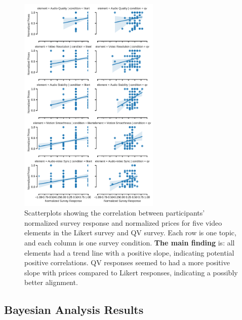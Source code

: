 \begin{figure}[htpb]
    \centering
    \includegraphics[width=0.6\textwidth, keepaspectratio=true]{content/image/correlation_per_element.pdf}
    \caption{
      Scatterplots showing the correlation between participants' normalized survey response and normalized prices for five video elements in the Likert survey and QV survey. Each row is one topic, and each column is one survey condition. \textbf{The main finding} is: all elements had a trend line with a positive slope, indicating potential positive correlations. QV responses seemed to had a more positive slope with prices compared to Likert responses, indicating a possibly better alignment.
    }
    \label{fig:topic_covariate_exp2}
\end{figure}


\subsection{Bayesian Analysis Results}


